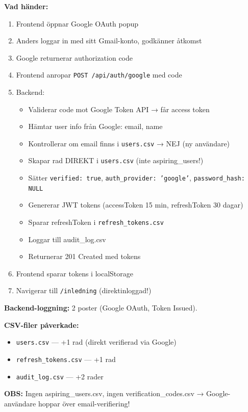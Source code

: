 \documentclass[12pt,a4paper]{article}
\begin{document}
\textbf{Vad händer:}
\begin{enumerate}[noitemsep]
  \item Frontend öppnar Google OAuth popup
  \item Anders loggar in med sitt Gmail-konto, godkänner åtkomst
  \item Google returnerar authorization code
  \item Frontend anropar \texttt{POST /api/auth/google} med code
  \item Backend:
  \begin{itemize}[noitemsep]
    \item Validerar code mot Google Token API → får access token
    \item Hämtar user info från Google: email, name
    \item Kontrollerar om email finns i \texttt{users.csv} → NEJ (ny användare)
    \item Skapar rad DIREKT i \texttt{users.csv} (inte aspiring\_users!)
    \item Sätter \texttt{verified: true}, \texttt{auth\_provider: 'google'}, \texttt{password\_hash: NULL}
    \item Genererar JWT tokens (accessToken 15 min, refreshToken 30 dagar)
    \item Sparar refreshToken i \texttt{refresh\_tokens.csv}
    \item Loggar till audit\_log.csv
    \item Returnerar 201 Created med tokens
  \end{itemize}
  \item Frontend sparar tokens i localStorage
  \item Navigerar till \texttt{/inledning} (direktinloggad!)
\end{enumerate}

\textbf{Backend-loggning:} 2 poster (Google OAuth, Token Issued).

\textbf{CSV-filer påverkade:}
\begin{itemize}[noitemsep]
  \item \texttt{users.csv} — +1 rad (direkt verifierad via Google)
  \item \texttt{refresh\_tokens.csv} — +1 rad
  \item \texttt{audit\_log.csv} — +2 rader
\end{itemize}

\textbf{OBS:} Ingen aspiring\_users.csv, ingen verification\_codes.csv → Google-användare hoppar över email-verifiering!
\end{document}
